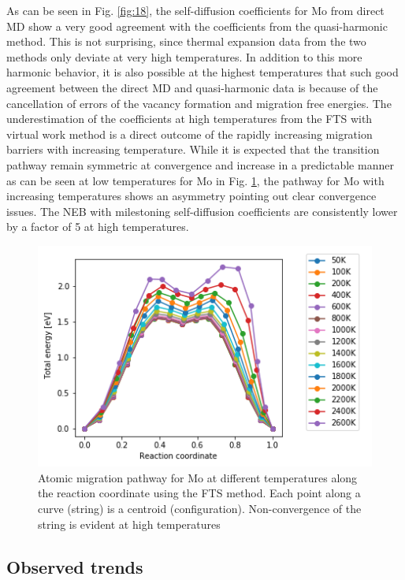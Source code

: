 \documentclass{article}
\begin{document}
As can be seen in Fig. \ref{fig:18}, the self-diffusion coefficients for Mo from direct MD show a very good agreement with the coefficients from the quasi-harmonic method. This is not surprising, since thermal expansion data from the two methods only deviate at very high temperatures. In addition to this more harmonic behavior, it is also possible at the highest temperatures that such good agreement between the direct MD and quasi-harmonic data is because of the cancellation of errors of the vacancy formation and migration free energies. The underestimation of the coefficients at high temperatures from the FTS with virtual work method is a direct outcome of the rapidly increasing migration barriers with increasing temperature. While it is expected that the transition pathway remain symmetric at convergence and increase in a predictable manner as can be seen at low temperatures for Mo in Fig. \ref{fig:19}, the pathway for Mo with increasing temperatures shows an asymmetry pointing out clear convergence issues. The NEB with milestoning self-diffusion coefficients are consistently lower by a factor of 5 at high temperatures.

\begin{figure}[!htp]
\centering
\includegraphics[scale=0.65]{migration_barriers}
\caption{Atomic migration pathway for Mo at different temperatures along the reaction coordinate using the FTS method. Each point along a curve (string) is a centroid (configuration). Non-convergence of the string is evident at high temperatures}
\label{fig:19}
\end{figure}

\subsection{Observed trends}
\end{document}
